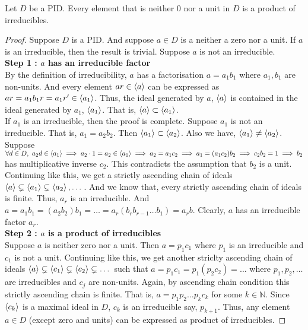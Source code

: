 \begin{theorem}
	Let $D$ be a PID.
	Every element that is neither $0$ nor a unit in $D$ is a product of irreducibles.
\end{theorem}
\begin{proof}
	Suppose $D$ is a PID.
	And suppose $a \in D$ is a neither a zero nor a unit.
	If $a$ is an irreducible, then the result is trivial.
	Suppose $a$ is not an irreducible.\\

	\textbf{Step 1 : $a$ has an irreducible factor}\\
	By the definition of irreducibility, $a$ has a factorisation $a = a_1b_1$ where $a_1,b_1$ are non-units.
	And every element $ar \in \left\langle a\right\rangle$ can be expressed as $ar = a_1b_1r = a_1r' \in \left\langle a_1\right\rangle$.
	Thus, the ideal generated by $a$, $\left\langle a\right\rangle$ is contained in the ideal generated by $a_1$, $\left\langle a_1\right\rangle$.
	That is, $\left\langle a\right\rangle \subset \left\langle a_1\right\rangle$.\\

	If $a_1$ is an irreducible, then the proof is complete.
	Suppose $a_1$ is not an irreducible.
	That is, $a_1 = a_2b_2$.
	Then $\left\langle a_1\right\rangle \subset \left\langle a_2\right\rangle$.
	Also we have, $\left\langle a_1\right\rangle \ne \left\langle a_2\right\rangle$.\\

	Suppose $\forall d \in D,\ a_2d \in \left\langle a_1\right\rangle \implies a_2\cdot 1 = a_2 \in \left\langle a_1\right\rangle \implies a_2 = a_1c_2 \implies a_1 = (a_1c_2)b_2 \implies c_2b_2 = 1 \implies b_2$ has multiplicative inverse $c_2$. This contradicts the assumption that $b_2$ is a unit.\\

	Continuing like this, we get a {\color{red}strictly} ascending chain of ideals $\left\langle a\right\rangle \subsetneq \left\langle a_1\right\rangle \subsetneq \left\langle a_2\right\rangle, \dots $.
	And we know that, every strictly ascending chain of ideals is finite.
	Thus, $a_r$ is an irreducible.
	And $a = a_1b_1 = (a_2b_2)b_1 = \dots = a_r(b_rb_{r-1}\dots b_1) = a_rb$.
	Clearly, $a$ has an irreducible factor $a_r$.\\

	\textbf{Step 2 : $a$ is a product of irreducibles}\\
	Suppose $a$ is neither zero nor a unit.
	Then $a = p_1c_1$ where $p_1$ is an irreducible and $c_1$ is not a unit.
	Continuing like this, we get another striclty ascending chain of ideals $\left\langle a\right\rangle \subsetneq \left\langle c_1\right\rangle \subsetneq \left\langle c_2\right\rangle \subsetneq \dots$ such that $a = p_1c_1 = p_1(p_2c_2) = \dots$ where $p_1,p_2,\dots$ are irreducibles and $c_j$ are non-units.
	Again, by ascending chain condition this strictly ascending chain is finite.
	That is, $a = p_1p_2\dots p_kc_k$ for some $k \in \mathbb{N}$.
	Since $\left\langle c_k\right\rangle$ is a maximal ideal in $D$, $c_k$ is an irreducible say, $p_{k+1}$.
	Thus, any element $a \in D$ (except zero and units) can be expressed as product of irreducibles.
\end{proof}

